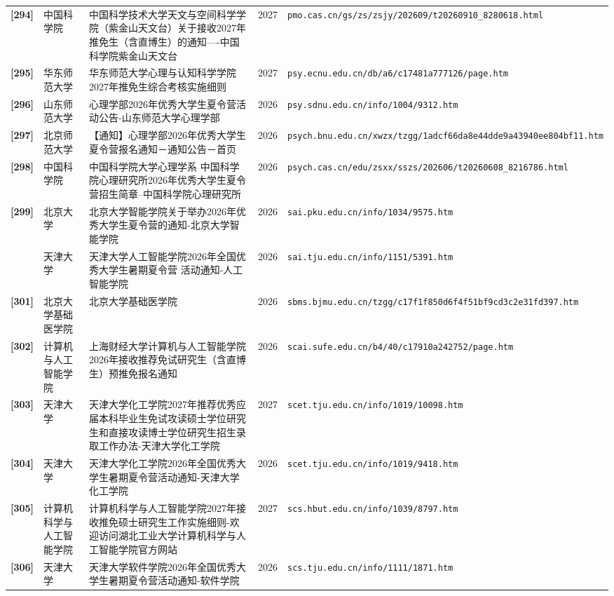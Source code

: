 {\begin{longtable}{@{}p{1.15cm}p{2.9cm}p{6.3cm}p{0.85cm}p{5.0cm}@{}}
\textbf{[294]} & 中国科学院 & 中国科学技术大学天文与空间科学学院（紫金山天文台）关于接收2027年推免生（含直博生）的通知----中国科学院紫金山天文台 & 2027 & \texttt{pmo.cas.cn/gs/zs/zsjy/202609/t20260910\_8280618.html} \\
\textbf{[295]} & 华东师范大学 & 华东师范大学心理与认知科学学院2027年推免生综合考核实施细则 & 2027 & \texttt{psy.ecnu.edu.cn/db/a6/c17481a777126/page.htm} \\
\textbf{[296]} & 山东师范大学 & 心理学部2026年优秀大学生夏令营活动公告-山东师范大学心理学部 & 2026 & \texttt{psy.sdnu.edu.cn/info/1004/9312.htm} \\
\textbf{[297]} & 北京师范大学 & 【通知】心理学部2026年优秀大学生夏令营报名通知－通知公告－首页 & 2026 & \texttt{psych.bnu.edu.cn/xwzx/tzgg/1adcf66da8e44dde9a43940ee804bf11.htm} \\
\textbf{[298]} & 中国科学院 & 中国科学院大学心理学系 中国科学院心理研究所2026年优秀大学生夏令营招生简章--中国科学院心理研究所 & 2026 & \texttt{psych.cas.cn/edu/zsxx/sszs/202606/t20260608\_8216786.html} \\
\textbf{[299]} & 北京大学 & 北京大学智能学院关于举办2026年优秀大学生夏令营的通知-北京大学智能学院 & 2026 & \texttt{sai.pku.edu.cn/info/1034/9575.htm} \\
[300] & 天津大学 & 天津大学人工智能学院2026年全国优秀大学生暑期夏令营 活动通知-人工智能学院 & 2026 & \texttt{sai.tju.edu.cn/info/1151/5391.htm} \\
\textbf{[301]} & 北京大学基础医学院 & 北京大学基础医学院 & 2026 & \texttt{sbms.bjmu.edu.cn/tzgg/c17f1f850d6f4f51bf9cd3c2e31fd397.htm} \\
\textbf{[302]} & 计算机与人工智能学院 & 上海财经大学计算机与人工智能学院2026年接收推荐免试研究生（含直博生）预推免报名通知 & 2026 & \texttt{scai.sufe.edu.cn/b4/40/c17910a242752/page.htm} \\
\textbf{[303]} & 天津大学 & 天津大学化工学院2027年推荐优秀应届本科毕业生免试攻读硕士学位研究生和直接攻读博士学位研究生招生录取工作办法-天津大学化工学院 & 2027 & \texttt{scet.tju.edu.cn/info/1019/10098.htm} \\
\textbf{[304]} & 天津大学 & 天津大学化工学院2026年全国优秀大学生暑期夏令营活动通知-天津大学化工学院 & 2026 & \texttt{scet.tju.edu.cn/info/1019/9418.htm} \\
\textbf{[305]} & 计算机科学与人工智能学院 & 计算机科学与人工智能学院2027年接收推免硕士研究生工作实施细则-欢迎访问湖北工业大学计算机科学与人工智能学院官方网站 & 2027 & \texttt{scs.hbut.edu.cn/info/1039/8797.htm} \\
\textbf{[306]} & 天津大学 & 天津大学软件学院2026年全国优秀大学生暑期夏令营活动通知-软件学院 & 2026 & \texttt{scs.tju.edu.cn/info/1111/1871.htm} \\

\end{longtable}}
